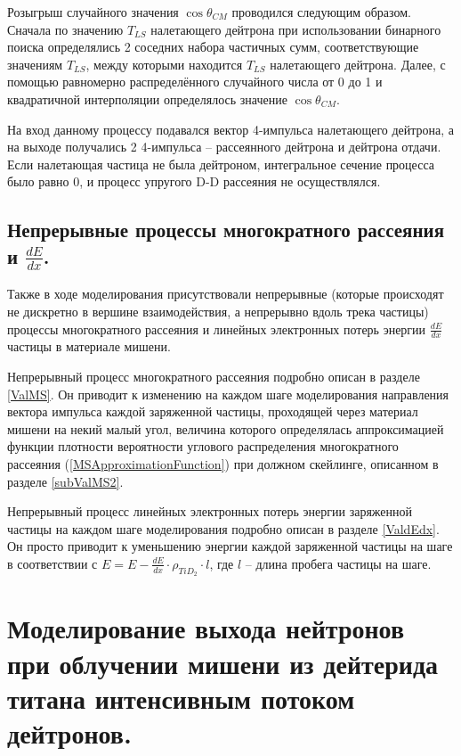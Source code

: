 \documentclass[a4paper,12pt]{article}
\begin{document}
\begin{large}
	Розыгрыш случайного значения $\cos{\theta_{CM}}$ проводился следующим образом.
	Сначала по значению $T_{LS}$ налетающего дейтрона при использовании бинарного поиска определялись 2 соседних набора частичных сумм, соответствующие значениям $T_{LS}$, между которыми находится $T_{LS}$ налетающего дейтрона.
	Далее, с помощью равномерно распределённого случайного числа от 0 до 1 и квадратичной интерполяции определялось значение $\cos{\theta_{CM}}$.
	
	На вход данному процессу подавался вектор 4-импульса налетающего дейтрона, а на выходе получались 2 4-импульса -- рассеянного дейтрона и дейтрона отдачи.
	Если налетающая частица не была дейтроном, интегральное сечение процесса было равно 0, и процесс упругого D-D рассеяния не осуществлялся.
	
	
\subsection{Непрерывные процессы многократного рассеяния и $\frac{dE}{dx}$.}
\label{MSanddEdxRealization}

	Также в ходе моделирования присутствовали непрерывные (которые происходят не дискретно в вершине взаимодействия, а непрерывно вдоль трека частицы) процессы многократного рассеяния и линейных электронных потерь энергии $\frac{dE}{dx}$ частицы в материале мишени.
	
	Непрерывный процесс многократного рассеяния подробно описан в разделе \ref{ValMS}.
	Он приводит к изменению на каждом шаге моделирования направления вектора импульса каждой заряженной частицы, проходящей через материал мишени на некий малый угол, величина которого определялась аппроксимацией функции плотности вероятности углового распределения многократного рассеяния (\ref{MSApproximationFunction}) при должном скейлинге, описанном в разделе \ref{subValMS2}.
	
	Непрерывный процесс линейных электронных потерь энергии заряженной частицы на каждом шаге моделирования подробно описан в разделе \ref{ValdEdx}.
	Он просто приводит к уменьшению энергии каждой заряженной частицы на шаге в соответствии с $E=E-\frac{dE}{dx} \cdot \rho_{TiD_2} \cdot l$, где $l$ -- длина пробега частицы на шаге.

	
\clearpage{}
\section{Моделирование выхода нейтронов при облучении мишени из дейтерида титана интенсивным потоком дейтронов.}
\label{NeutronOutput}


\end{large}
\end{document}
